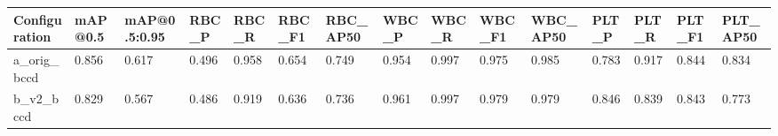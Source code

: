 \begin{tabular}{lllllllllllllll}
\toprule
Configuration & mAP@0.5 & mAP@0.5:0.95 & RBC_P & RBC_R & RBC_F1 & RBC_AP50 & WBC_P & WBC_R & WBC_F1 & WBC_AP50 & PLT_P & PLT_R & PLT_F1 & PLT_AP50 \\
\midrule
a_orig_bccd & 0.856 & 0.617 & 0.496 & 0.958 & 0.654 & 0.749 & 0.954 & 0.997 & 0.975 & 0.985 & 0.783 & 0.917 & 0.844 & 0.834 \\
b_v2_bccd & 0.829 & 0.567 & 0.486 & 0.919 & 0.636 & 0.736 & 0.961 & 0.997 & 0.979 & 0.979 & 0.846 & 0.839 & 0.843 & 0.773 \\
\bottomrule
\end{tabular}

